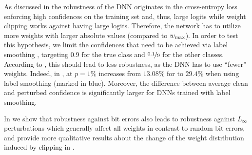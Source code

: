 As discussed in  the robustness of the DNN originates in the cross-entropy loss enforcing high confidences on the training set and, thus, large logits while weight clipping works against having large logits. Therefore, the network has to utilize more weights with larger absolute values (compared to $\wmax$).
In order to test this hypothesis, we limit the confidences that need to be achieved via label smoothing \cite{SzegedyCVPR2016}, targeting $0.9$ for the true class and $\nicefrac{0.1}{9}$ for the other classes. According to , this should lead to less robustness, as the DNN has to use ``fewer'' weights. Indeed, in , \RTE at $p=1\%$ increases from $13.08\%$ for \Clipping[$0.15$] to $29.4\%$ when using label smoothing (marked in {\color{colorbrewer2}blue}). Moreover, the difference between average clean and perturbed confidence is significantly larger for DNNs trained with label smoothing. 

In  we show that robustness against bit errors also leads to robustness against $L_\infty$ perturbations which generally affect all weights in contrast to random bit errors, and provide more qualitative results about the change of the weight distribution induced by clipping in .

